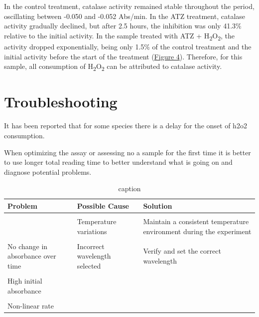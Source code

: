 \documentclass[
  9pt,
  american,
  a5paper,
  extrafontsizes,onecolumn,openright
  ]{memoir}
\begin{document}
\normalsize

In the control treatment, catalase activity remained stable throughout the period, oscillating between -0.050 and -0.052 Abs/min. In the ATZ treatment, catalase activity gradually declined, but after 2.5 hours, the inhibition was only 41.3\% relative to the initial activity. In the sample treated with ATZ + H\textsubscript{2}O\textsubscript{2}, the activity dropped exponentially, being only 1.5\% of the control treatment and the initial activity before the start of the treatment (\hyperref[fig-inhibitor]{Figure 4}). Therefore, for this sample, all consumption of H\textsubscript{2}O\textsubscript{2} can be attributed to catalase activity.

\section{Troubleshooting}\label{troubleshooting}

It has been reported that for some species there is a delay for the onset of h2o2 consumption.

When optimizing the assay or assessing no a sample for the first time it is better to use longer total reading time to better understand what is going on and diagnose potential problems.

\scriptsize

\begin{table}[!h]
\centering
\caption{\label{tab:cat-troubleshooting}caption}
\centering
\fontsize{7}{9}\selectfont
\begin{tabular}[t]{>{\raggedright\arraybackslash}p{15em}>{\raggedright\arraybackslash}p{10em}>{\raggedright\arraybackslash}p{15em}}
\toprule
\textbf{Problem} & \textbf{Possible Cause} & \textbf{Solution}\\
\midrule
\cellcolor{gray!10}{Inconsistent results between runs} & \cellcolor{gray!10}{Pipetting errors} & \cellcolor{gray!10}{Calibrate pipettes and ensure consistent technique}\\
 & Temperature variations & Maintain a consistent temperature environment during the experiment\\
\cellcolor{gray!10}{} & \cellcolor{gray!10}{Inconsistent incubation times} & \cellcolor{gray!10}{Standardize and carefully monitor incubation times}\\
No change in absorbance over time & Incorrect wavelength selected & Verify and set the correct wavelength\\
\cellcolor{gray!10}{} & \cellcolor{gray!10}{Sample not added} & \cellcolor{gray!10}{Ensure the sample is correctly pipetted into the wells}\\
\addlinespace
High initial absorbance &  & \\
\cellcolor{gray!10}{Low initial absorbance} & \cellcolor{gray!10}{} & \cellcolor{gray!10}{}\\
Non-linear rate &  & \\
\bottomrule
\end{tabular}
\end{table}
\end{document}
